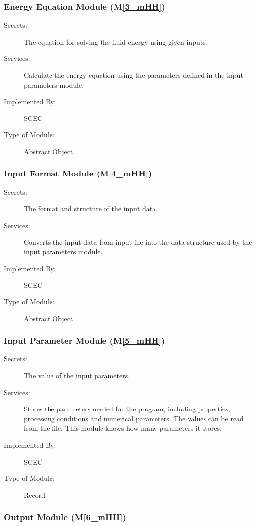 \documentclass[12pt, titlepage]{article}
\newcommand{\mref}[1]{M\ref{#1}}
\begin{document}
\subsubsection{Energy Equation Module (\mref{3_mHH})}

\begin{description}
\item[Secrets:] The equation for solving the fluid energy using given inputs. 
\item[Services:] Calculate the energy equation using the parameters defined in the input parameters module.  
\item[Implemented By:] SCEC
\item[Type of Module:] Abstract Object
\end{description}


\subsubsection{Input Format Module (\mref{4_mHH})}

\begin{description}
\item[Secrets:]The format and structure of the input data.
\item[Services:]Converts the input data from input file into the data structure used by the
  input parameters module.
\item[Implemented By:] SCEC
\item[Type of Module:] Abstract Object
\end{description}

\subsubsection{Input Parameter Module (\mref{5_mHH})}

\begin{description}
\item[Secrets:] The value of the input parameters. 
\item[Services:] Stores the parameters needed for the program, including properties, processing conditions and numerical parameters. The values can be read from the file. This module knows how many parameters it stores. 
\item[Implemented By:] SCEC
\item[Type of Module:] Record
\end{description}

\subsubsection{Output Module (\mref{6_mHH})}
\end{document}
